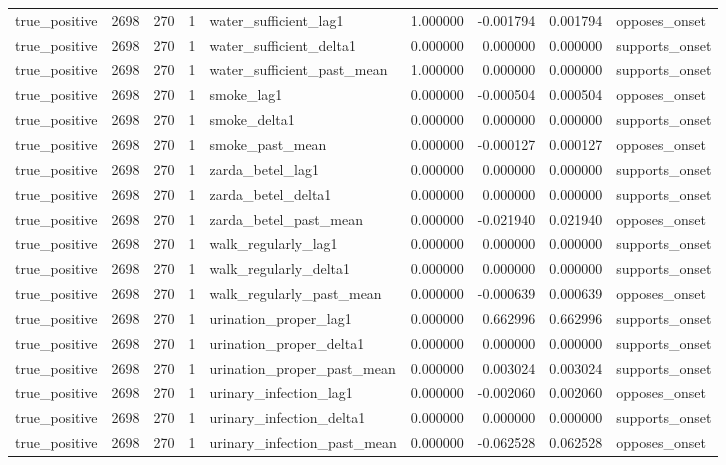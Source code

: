 \begin{longtable}{lrrrlrrrl}
true\_positive & 2698 & 270 & 1 & water\_sufficient\_lag1 & 1.000000 & -0.001794 & 0.001794 & opposes\_onset \\
true\_positive & 2698 & 270 & 1 & water\_sufficient\_delta1 & 0.000000 & 0.000000 & 0.000000 & supports\_onset \\
true\_positive & 2698 & 270 & 1 & water\_sufficient\_past\_mean & 1.000000 & 0.000000 & 0.000000 & supports\_onset \\
true\_positive & 2698 & 270 & 1 & smoke\_lag1 & 0.000000 & -0.000504 & 0.000504 & opposes\_onset \\
true\_positive & 2698 & 270 & 1 & smoke\_delta1 & 0.000000 & 0.000000 & 0.000000 & supports\_onset \\
true\_positive & 2698 & 270 & 1 & smoke\_past\_mean & 0.000000 & -0.000127 & 0.000127 & opposes\_onset \\
true\_positive & 2698 & 270 & 1 & zarda\_betel\_lag1 & 0.000000 & 0.000000 & 0.000000 & supports\_onset \\
true\_positive & 2698 & 270 & 1 & zarda\_betel\_delta1 & 0.000000 & 0.000000 & 0.000000 & supports\_onset \\
true\_positive & 2698 & 270 & 1 & zarda\_betel\_past\_mean & 0.000000 & -0.021940 & 0.021940 & opposes\_onset \\
true\_positive & 2698 & 270 & 1 & walk\_regularly\_lag1 & 0.000000 & 0.000000 & 0.000000 & supports\_onset \\
true\_positive & 2698 & 270 & 1 & walk\_regularly\_delta1 & 0.000000 & 0.000000 & 0.000000 & supports\_onset \\
true\_positive & 2698 & 270 & 1 & walk\_regularly\_past\_mean & 0.000000 & -0.000639 & 0.000639 & opposes\_onset \\
true\_positive & 2698 & 270 & 1 & urination\_proper\_lag1 & 0.000000 & 0.662996 & 0.662996 & supports\_onset \\
true\_positive & 2698 & 270 & 1 & urination\_proper\_delta1 & 0.000000 & 0.000000 & 0.000000 & supports\_onset \\
true\_positive & 2698 & 270 & 1 & urination\_proper\_past\_mean & 0.000000 & 0.003024 & 0.003024 & supports\_onset \\
true\_positive & 2698 & 270 & 1 & urinary\_infection\_lag1 & 0.000000 & -0.002060 & 0.002060 & opposes\_onset \\
true\_positive & 2698 & 270 & 1 & urinary\_infection\_delta1 & 0.000000 & 0.000000 & 0.000000 & supports\_onset \\
true\_positive & 2698 & 270 & 1 & urinary\_infection\_past\_mean & 0.000000 & -0.062528 & 0.062528 & opposes\_onset \\

\end{longtable}
